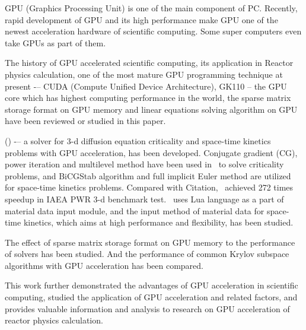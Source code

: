 
\begin{eabstract}

GPU (Graphics Processing Unit) is one of the main component of PC.
 Recently, rapid development of GPU and its high performance make 
 GPU one of the newest acceleration hardware of scientific computing. 
 Some super computers even take GPUs as part of them.

The history of GPU accelerated scientific computing, 
its application in Reactor physics calculation, 
one of the most mature GPU programming technique at present 
-– CUDA (Compute Unified Device Architecture), 
GK110 -- the GPU core which has highest computing performance
in the world, the sparse matrix storage format on GPU memory 
and linear equations solving algorithm on GPU have been 
reviewed or studied in this paper.

\ProgramName (\ProgramFullName) -– a solver for 3-d diffusion
 equation criticality and space-time kinetics problems with
  GPU acceleration, has been developed. Conjugate gradient (CG),
   power iteration and multilevel method have been used in 
   \ProgramName \ to solve criticality problems, and BiCGStab 
   algorithm and full implicit Euler method are utilized for 
   space-time kinetics problems. Compared with Citation, 
   \ProgramName \ achieved 272 times speedup in IAEA PWR 3-d benchmark test.
\ProgramName \ uses Lua language as a part of material data input module,
 and the  input method of material data for space-time kinetics,
  which aims at high performance and flexibility, has been studied. 

The effect of sparse matrix storage format on GPU memory to the performance
 of solvers has been studied. And the performance of
  common Krylov subspace algorithms with GPU acceleration has been compared.

This work further demonstrated the advantages of GPU acceleration
 in scientific computing, studied the application of GPU acceleration
 and related factors, and provides valuable information
 and analysis to research on GPU acceleration of reactor physics calculation.

\end{eabstract}

